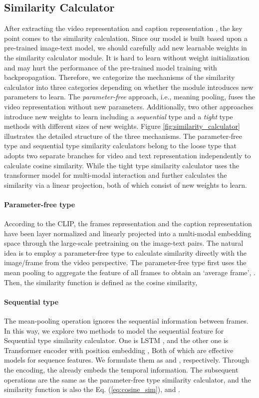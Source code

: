 \documentclass[11pt]{article}
\begin{document}
	\subsection{Similarity Calculator}
	\label{similarity_calculator}
	After extracting the video representation  and caption representation , the key point comes to the similarity calculation. Since our model is built based upon a pre-trained image-text model, we should carefully add new learnable weights in the similarity calculator module. It is hard to learn without weight initialization and may hurt the performance of the pre-trained model training with backpropagation. Therefore, we categorize the mechanisms of the similarity calculator into three categories depending on whether the module introduces new parameters to learn. The \emph{parameter-free} approach, i.e., meaning pooling, fuses the video representation without new parameters. Additionally, two other approaches introduce new weights to learn including a \emph{sequential} type and a \emph{tight} type methods with different sizes of new weights. Figure \ref{fig:similarity_calculator} illustrates the detailed structure of the three mechanisms. The parameter-free type and sequential type similarity calculators belong to the loose type that adopts two separate branches for video and text representation independently to calculate cosine similarity. While the tight type similarity calculator uses the transformer model for multi-modal interaction and further calculates the similarity via a linear projection, both of which consist of new weights to learn.

	\paragraph{Parameter-free type}
	According to the CLIP, the frames representation  and the caption representation  have been layer normalized and linearly projected into a multi-modal embedding space through the large-scale pretraining on the image-text pairs. The natural idea is to employ a parameter-free type to calculate similarity directly with the image/frame from the video perspective. The parameter-free type first uses the mean pooling to aggregate the feature of all frames to obtain an `average frame', . Then, the similarity function  is defined as the cosine similarity,
	

	\paragraph{Sequential type}
	The mean-pooling operation ignores the sequential information between frames. In this way, we explore two methods to model the sequential feature for Sequential type similarity calculator. One is LSTM \cite{hochreiter1997long, gers2002learning}, and the other one is Transformer encoder \cite{vaswani2017attention} with position embedding , Both of which are effective models for sequence features. We formulate them as  and , respectively. Through the encoding, the  already embeds the temporal information. The subsequent operations are the same as the parameter-free type similarity calculator, and the similarity function is also the Eq. (\ref{eq:cosine_sim}), and .
\end{document}
